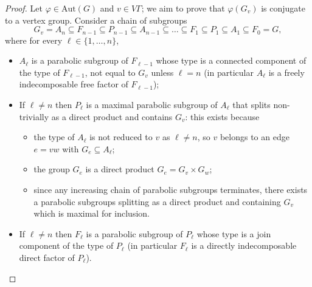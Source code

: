 \documentclass[a4paper,english,11pt]{article}
\theoremstyle{definition}
\theoremstyle{remark}
\newcommand{\Aut}{\mathrm{Aut}}
\begin{document}
\begin{proof}
Let $\varphi\in\Aut(G)$ and $v\in V\Gamma$; we aim to prove that $\varphi(G_v)$ is conjugate to a vertex group. Consider a chain of subgroups \[G_{v}=A_n\subseteq F_{n-1}\subseteq P_{n-1}\subseteq A_{n-1}\subseteq\dots\subseteq F_1\subseteq P_1\subseteq A_1\subseteq F_0=G,\]
where for every $\ell\in\{1,\dots,n\}$,
    \begin{itemize}
        \item $A_\ell$ is a parabolic subgroup of $F_{\ell-1}$ whose type is a connected component of the type of $F_{\ell-1}$, not equal to $G_v$ unless $\ell=n$ (in particular $A_\ell$ is a freely indecomposable free factor of $F_{\ell-1}$);
        \item If $\ell\neq n$ then $P_\ell$ is a maximal parabolic subgroup of $A_\ell$ that splits non-trivially as a direct product and contains $G_v$: this exists because
        \begin{itemize}
        \item the type of $A_\ell$ is not reduced to $v$ as $\ell\neq n$, so $v$ belongs to an edge $e=vw$ with $G_e\subseteq A_\ell$;
        \item the group $G_e$ is a direct product $G_e=G_v\times G_w$;
        \item since any increasing chain of parabolic subgroups terminates, there exists a parabolic subgroups splitting as a direct product and containing $G_v$ which is maximal for inclusion. 
        \end{itemize}
        \item If $\ell\neq n$ then $F_\ell$ is a parabolic subgroup of $P_\ell$ whose type is a join component of the type of $P_\ell$ (in particular $F_\ell$ is a directly indecomposable direct factor of $P_\ell$).
        \end{itemize}
        

\end{proof}
\end{document}
